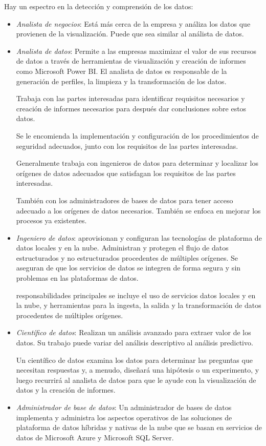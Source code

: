 \documentclass[12pt]{report}
\newcounter{it}
\theoremstyle{largebreak}
\begin{document}
    Hay un espectro en la detección y comprensión de los datos:

    \begin{itemize}
        \item \textit{Analista de negocios}: Está más cerca de la empresa y análiza los datos que provienen de la visualización. Puede que sea similar al análista de datos.
        \item \textit{Analista de datos}: Permite a las empresas maximizar el valor de sus recursos de datos a través de herramientas de visualización y creación de informes como Microsoft Power BI. El analista de datos es responsable de la generación de perfiles, la limpieza y la transformación de los datos.
        
        Trabaja con las partes interesadas para identificar requisitos necesarios y creación de informes necesarios para después dar conclusiones sobre estos datos.

        Se le encomienda la implementación y configuración de los procedimientos de seguridad adecuados, junto con los requisitos de las partes interesadas.

        Generalmente trabaja con ingenieros de datos para determinar y localizar los orígenes de datos adecuados que satisfagan los requisitos de las partes interesadas.

        También con los administradores de bases de datos para tener acceso adecuado a los orígenes de datos necesarios. También se enfoca en mejorar los procesos ya existentes.
        \item \textit{Ingeniero de datos}: aprovisionan y configuran las tecnologías de plataforma de datos locales y en la nube. Administran y protegen el flujo de datos estructurados y no estructurados procedentes de múltiples orígenes. Se aseguran de que los servicios de datos se integren de forma segura y sin problemas en las plataformas de datos.

        responsabilidades principales se incluye el uso de servicios datos locales y en la nube, y herramientas para la ingesta, la salida y la transformación de datos procedentes de múltiples orígenes.
        \item \textit{Científico de datos}: Realizan un análisis avanzado para extraer valor de los datos. Su trabajo puede variar del análisis descriptivo al análisis predictivo.
        
        Un científico de datos examina los datos para determinar las preguntas que necesitan respuestas y, a menudo, diseñará una hipótesis o un experimento, y luego recurrirá al analista de datos para que le ayude con la visualización de datos y la creación de informes.
        \item \textit{Administrador de base de datos}: Un administrador de bases de datos implementa y administra los aspectos operativos de las soluciones de plataforma de datos híbridas y nativas de la nube que se basan en servicios de datos de Microsoft Azure y Microsoft SQL Server.
    \end{itemize}
\end{document}
